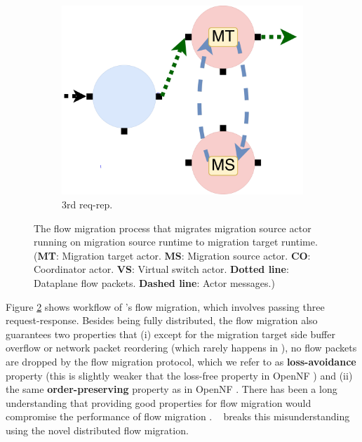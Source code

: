 \begin{figure}[!h]
  \begin{subfigure}[t]{0.33\linewidth}
 \centering
   \includegraphics[width=\columnwidth]{figure/nfactor-mig3.pdf}
   \caption{3rd req-rep.}\label{fig:mig3} \end{subfigure}\hfill
 \caption{The flow migration process that migrates migration source actor running on migration source runtime to migration target runtime. (\textbf{MT}: Migration target actor. \textbf{MS}: Migration source actor. \textbf{CO}: Coordinator actor. \textbf{VS}: Virtual switch actor. \textbf{Dotted line}: Dataplane flow packets. \textbf{Dashed line}: Actor messages.)}
\label{fig:mig}
\end{figure}

Figure \ref{fig:mig} shows workflow of \nfactor's flow migration, which involves passing three request-response. Besides being fully distributed, the flow migration also guarantees two properties that (i) except for the migration target side buffer overflow or network packet reordering (which rarely happens in \nfactor), no flow packets are dropped by the flow migration protocol, which we refer to as \textbf{loss-avoidance} property (this is slightly weaker that the loss-free property in OpenNF \cite{gember2015opennf}) and (ii) the same \textbf{order-preserving} property as in OpenNF \cite{gember2015opennf}. There has been a long understanding that providing good properties for flow migration would compromise the performance of flow migration \cite{gember2015opennf}. \nfactor~ breaks this misunderstanding using the novel distributed flow migration.

